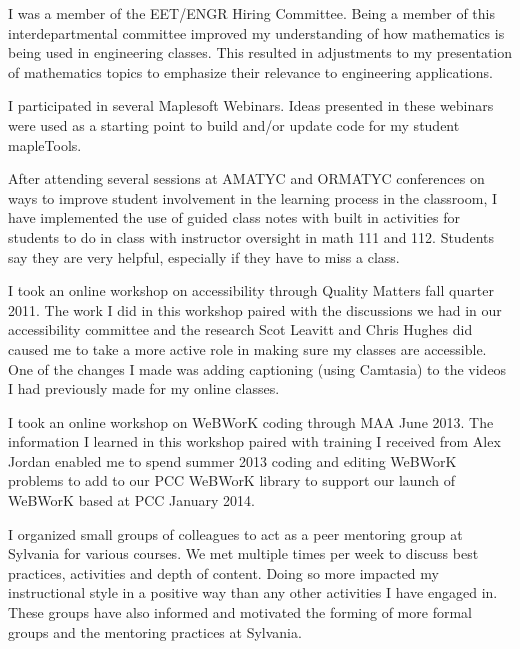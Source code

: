 \begin{description}[style=nextline]
	\item[Kenneth Kidoguchi (Full time Instructor, Sylvania Campus)]
	I was a member of the EET/ENGR Hiring Committee.  Being a member of this
	interdepartmental committee improved my understanding of how mathematics is
	being used in engineering classes.  This resulted in adjustments to my
	presentation of mathematics topics to emphasize their relevance to engineering
	applications.

	I participated in several Maplesoft Webinars.  Ideas presented in these
	webinars were used as a starting point to build and/or update code for my
	student mapleTools.

	\item[Jerry Kissick (Faculty Chair, Rock Creek Campus)]
	After attending several sessions at AMATYC and ORMATYC conferences on ways to
	improve student involvement in the learning process in the classroom, I have
	implemented the use of guided class notes with built in activities for students
	to do in class with instructor oversight in math 111 and 112. Students say they
	are very helpful, especially if they have to miss a class.

	\item[Kandace Kling (Full-time Instructor, Sylvania Campus)]
	I took an online workshop on accessibility through Quality Matters fall quarter
	2011. The work I did in this workshop paired with the discussions we had in our
	accessibility committee and the research Scot Leavitt and Chris Hughes did
	caused me to take a more active role in making sure my classes are accessible.
	One of the changes I made was adding captioning (using Camtasia) to the videos
	I had previously made for my online classes.

	I took an online workshop on WeBWorK coding through MAA June 2013. The
	information I learned in this workshop paired with training I received from
	Alex Jordan enabled me to spend summer 2013 coding and editing WeBWorK problems
	to add to our PCC WeBWorK library to support our launch of WeBWorK based at PCC
	January 2014.

	\item[Ross Kouzes (Full-time Instructor, Sylvania Campus)]
	I organized small groups of colleagues to act as a peer mentoring group at
	Sylvania for various courses. We met multiple times per week to discuss best
	practices, activities and depth of content. Doing so more impacted my
	instructional style in a positive way than any other activities I have engaged
	in. These groups have also informed and motivated the forming of more formal
	groups and the mentoring practices at Sylvania.


\end{description}
